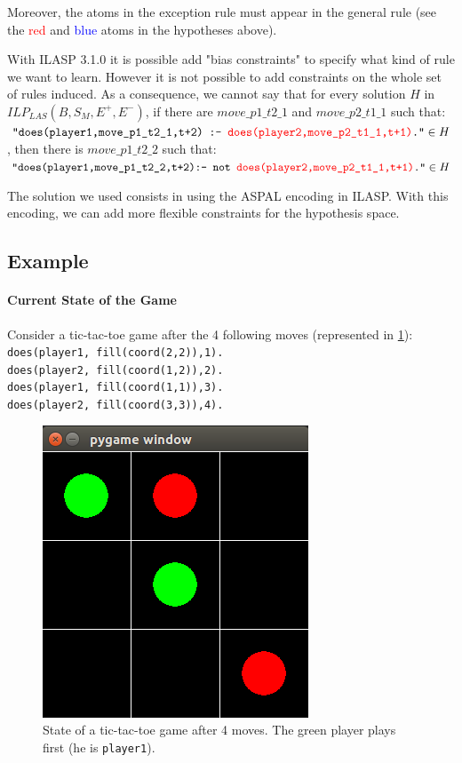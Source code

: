 \documentclass[12pt,twoside]{report}
\begin{document}

Moreover, the atoms in the exception rule must appear in the general rule (see the \textcolor{red}{red} and \textcolor{blue}{blue} atoms in the hypotheses above).

\bigskip

With ILASP 3.1.0 it is possible add "bias constraints" to specify what kind of rule we want to learn. However it is not possible to add constraints on the whole set of rules induced. As a consequence, we cannot say that for every solution $H$ in $ILP_{LAS}(B,S_M,E^+,E^-)$, 
if there are $move\_p1\_t2\_1$ and $move\_p2\_t1\_1$ such that:
\\ $\texttt{"does(player1,move\_p1\_t2\_1,t+2) :- \textcolor{red}{does(player2,move\_p2\_t1\_1,t+1)}."}\in H$, 
then there is $move\_p1\_t2\_2$ such that:\\
$\texttt{"does(player1,move\_p1\_t2\_2,t+2):- not \textcolor{red}{does(player2,move\_p2\_t1\_1,t+1)}."}\in H$

\bigskip

The solution we used consists in using the ASPAL encoding in ILASP. With this encoding, we can add more flexible constraints for the hypothesis space.

\subsection{Example}

\paragraph{Current State of the Game}

Consider a tic-tac-toe game after the 4 following moves (represented in \ref{fig:ttt_ex}):\newline
\texttt{does(player1, fill(coord(2,2)),1).\\
does(player2, fill(coord(1,2)),2).\\
does(player1, fill(coord(1,1)),3).\\
does(player2, fill(coord(3,3)),4).}

\begin{figure}[h]
\centering
\includegraphics[width = 0.3\hsize]{figures/ttt_example.png}
\caption{State of a tic-tac-toe game after 4 moves. The green player plays first (he is \texttt{player1}).}
\label{fig:ttt_ex}
\end{figure}
\end{document}
